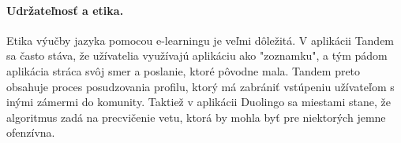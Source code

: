\documentclass[10pt,oneside,slovak,a4paper]{article}
\begin{document}
\paragraph{Udržateľnosť a etika.}
Etika výučby jazyka pomocou e-learningu je veľmi dôležitá. V aplikácii Tandem sa často stáva, že užívatelia využívajú aplikáciu ako "zoznamku", a tým pádom aplikácia stráca svôj smer a poslanie, ktoré pôvodne mala. Tandem preto obsahuje proces posudzovania profilu, ktorý má zabrániť vstúpeniu užívateľom s inými zámermi do komunity. Taktiež v aplikácii Duolingo sa miestami stane, že algoritmus zadá na precvičenie vetu, ktorá by mohla byť pre niektorých jemne ofenzívna. 



\end{document}
